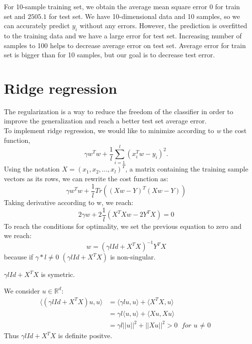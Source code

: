 \documentclass{article} %
\begin{document}
For 10-sample training set, we obtain the average mean square error $0$ for train set and $2505.1$ for test set. We have 10-dimensional data and 10 samples, so we can accurately predict $y_i$ without any errors. However, the prediction is overfitted to the training data and we have a large error for test set. Increasing number of samples to 100 helps to decrease average error on test set. Average error for train set is bigger than for 10 samples, but our goal is to decrease test error.

\section{Ridge regression}

The regularization is a way to reduce the freedom of the classifier in order to improve the generalization and reach a better test set average error. 
\\ To implement ridge regression, we would like to minimize according to \textit{w} the cost function, 
\begin{equation}
\gamma w^{T}w + \frac{1}{l} \sum_{i=1}^{l}(x_{i}^{T}w - y_{i})^{2}.
\end{equation}
Using the notation $X=(x_{1}, x_{2},...,x_{l})^{T}$, a matrix containing the training sample vectors as its rows, we can rewrite the cost function as: 
\begin{equation}
\gamma w^{T} w + \frac{1}{l} Tr((Xw - Y)^{T}(Xw - Y))
\end{equation}
Taking derivative according to w, we reach: 
\begin{equation}
2\gamma w + 2 \frac{1}{l} (X^{T}Xw - 2Y^{T}X)=0
\end{equation}
To reach the conditions for optimality, we set the previous equation to zero and we reach: 
\begin{equation}
w=(\gamma l Id +X^{T}X)^{-1}Y^{T}X
\end{equation}
because if $\gamma*l \ne 0$ $(\gamma l Id +X^{T}X)$ is non-singular.

$\gamma l Id +X^{T}X $ is symetric.

We consider $u \in \mathbb{R}^{d}$:
\begin{align*}
\langle (\gamma l Id +X^{T}X)u,u \rangle &= \langle \gamma l u,u \rangle + \langle X^{T}X,u \rangle
\\  &= \gamma l \langle  u,u \rangle + \langle X u, X u \rangle
\\ &= \gamma l ||u||^{2} + ||Xu||^{2} > 0 \textit{ for u $\ne$ 0}
\end{align*}
Thus $\gamma l Id +X^{T}X$ is definite positve. 
\end{document}
